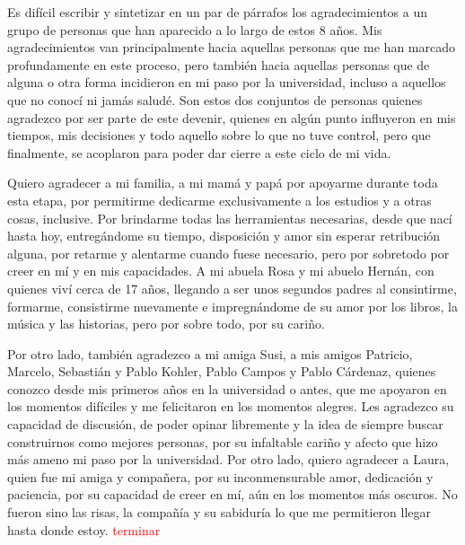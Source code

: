 
Es difícil escribir y sintetizar en un par de párrafos los agradecimientos a un grupo de personas que han aparecido a lo largo de estos 8 años. Mis agradecimientos van principalmente hacia aquellas personas que me han marcado profundamente en este proceso, pero también hacia aquellas personas que de alguna o otra forma incidieron en mi paso por la universidad, incluso a aquellos que no conocí ni jamás saludé. Son estos dos conjuntos de personas quienes agradezco por ser parte de este devenir, quienes en algún punto influyeron en mis tiempos, mis decisiones y todo aquello sobre lo que no tuve control, pero que finalmente, se acoplaron para poder dar cierre a este ciclo de mi vida.

Quiero agradecer a mi familia, a mi mamá y papá por apoyarme durante toda esta etapa, por permitirme dedicarme exclusivamente a los estudios y a otras cosas, inclusive. Por brindarme todas las herramientas necesarias, desde que nací hasta hoy, entregándome su tiempo, disposición y amor sin esperar retribución alguna, por retarme y alentarme cuando fuese necesario, pero por sobretodo por creer en mí y en mis capacidades. A mi abuela Rosa y mi abuelo Hernán, con quienes viví cerca de 17 años, llegando a ser unos segundos padres al consintirme, formarme, consistirme nuevamente e impregnándome de su amor por los libros, la música y las historias, pero por sobre todo, por su cariño.

Por otro lado, también agradezco a mi amiga Susi, a mis amigos Patricio, Marcelo, Sebastián y Pablo Kohler, Pablo Campos y Pablo Cárdenaz, quienes conozco desde mis primeros años en la universidad o antes, que me apoyaron en los momentos difíciles y me felicitaron en los momentos alegres. Les agradezco su capacidad de discusión, de poder opinar libremente y la idea de siempre buscar construirnos como mejores personas, por su infaltable cariño y afecto que hizo más ameno mi paso por la universidad. Por otro lado, quiero agradecer a Laura, quien fue mi amiga y compañera, por su inconmensurable amor, dedicación y paciencia, por su capacidad de creer en mí, aún en los momentos más oscuros. No fueron sino las risas, la compañía y su sabiduría lo que me permitieron llegar hasta donde estoy. \textcolor{red}{terminar} 


